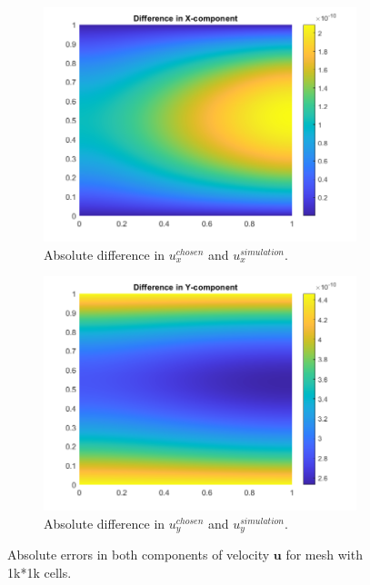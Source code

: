 \documentclass[]{article}
\begin{document}
\begin{figure}
	\centering
	\begin{subfigure}{.49\textwidth}
		\centering
		\includegraphics[width=1\linewidth]{figs/MMS_xdiff}
		\caption{Absolute difference in $ u_x^{chosen} $ and $ u_x^{simulation} $.}
		\label{fig:mmsxdiff}
	\end{subfigure}
	\begin{subfigure}{.49\textwidth}
		\centering
		\includegraphics[width=1\linewidth]{figs/MMS_ydiff}
		\caption{Absolute difference in $ u_y^{chosen} $ and $ u_y^{simulation} $.}
		\label{fig:mmsydiff}
	\end{subfigure}
	\caption{Absolute errors in both components of velocity $ \mathbf{u} $ for mesh with 1k*1k cells.}
	\label{fig:MMS_differences}
\end{figure}
\end{document}
